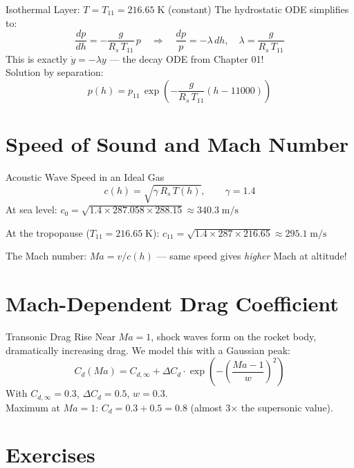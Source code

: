 \documentclass[12pt, a4paper]{article}
\begin{document}
\begin{theorybox}{Isothermal Layer: $T = T_{11} = 216.65\;\text{K}$ (constant)}
The hydrostatic ODE simplifies to:
\[
  \frac{dp}{dh} = -\frac{g}{R_s\,T_{11}}\,p \quad \Rightarrow \quad \frac{dp}{p} = -\lambda\,dh,
  \quad \lambda = \frac{g}{R_s\,T_{11}}
\]
This is exactly $\dot{y} = -\lambda y$ — the decay ODE from Chapter 01!\\
Solution by separation:
\[
  p(h) = p_{11}\,\exp\!\left(-\frac{g}{R_s\,T_{11}}(h - 11000)\right)
\]
\end{theorybox}

\section{Speed of Sound and Mach Number}

\begin{theorybox}{Acoustic Wave Speed in an Ideal Gas}
\[
  c(h) = \sqrt{\gamma\,R_s\,T(h)}, \qquad \gamma = 1.4
\]
At sea level: $c_0 = \sqrt{1.4 \times 287.058 \times 288.15} \approx 340.3\;\text{m/s}$

At the tropopause ($T_{11} = 216.65\;\text{K}$): $c_{11} = \sqrt{1.4 \times 287 \times 216.65} \approx 295.1\;\text{m/s}$

The Mach number: $Ma = v / c(h)$ — same speed gives \textit{higher} Mach at altitude!
\end{theorybox}

\section{Mach-Dependent Drag Coefficient}

\begin{theorybox}{Transonic Drag Rise}
Near $Ma=1$, shock waves form on the rocket body, dramatically increasing drag.
We model this with a Gaussian peak:
\[
  C_d(Ma) = C_{d,\infty} + \Delta C_d \cdot \exp\!\left(-\left(\frac{Ma - 1}{w}\right)^{\!2}\right)
\]
With $C_{d,\infty} = 0.3$, $\Delta C_d = 0.5$, $w = 0.3$.\\
Maximum at $Ma=1$: $C_d = 0.3 + 0.5 = 0.8$ (almost 3$\times$ the supersonic value).
\end{theorybox}

\section{Exercises}
\end{document}
